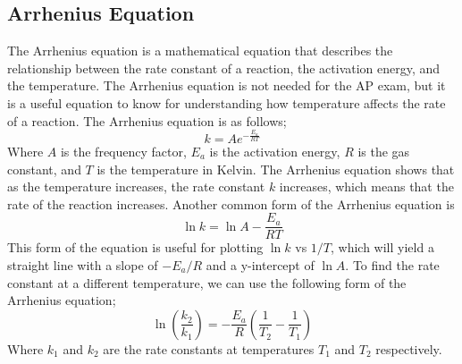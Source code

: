 \subsection{Arrhenius Equation}
The Arrhenius equation is a mathematical equation that describes the relationship between the rate constant of a reaction, the activation energy, and the temperature. The Arrhenius equation is not needed for the AP exam, but it is a useful equation to know for understanding how temperature affects the rate of a reaction. The Arrhenius equation is as follows;
\begin{equation}\label{eq:arrhenius1}
    k = Ae^{-\frac{E_a}{RT}}
\end{equation}
Where $A$ is the frequency factor, $E_a$ is the activation energy, $R$ is the gas constant, and $T$ is the temperature in Kelvin. The Arrhenius equation shows that as the temperature increases, the rate constant $k$ increases, which means that the rate of the reaction increases. 
Another common form of the Arrhenius equation is
\begin{equation}\label{eq:arrhenius2}
    \ln{k} = \ln{A} - \frac{E_a}{RT}
\end{equation}
This form of the equation is useful for plotting $\ln{k}$ vs $1/T$, which will yield a straight line with a slope of $-E_a/R$ and a y-intercept of $\ln{A}$.
To find the rate constant at a different temperature, we can use the following form of the Arrhenius equation;
\begin{equation}\label{eq:arrhenius3}
    \ln{\left(\frac{k_2}{k_1}\right)} = -\frac{E_a}{R}\left(\frac{1}{T_2} - \frac{1}{T_1}\right)
\end{equation}
Where $k_1$ and $k_2$ are the rate constants at temperatures $T_1$ and $T_2$ respectively.

